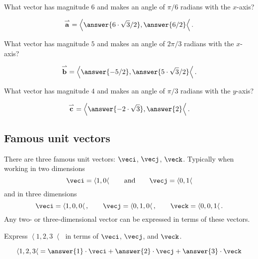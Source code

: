 \documentclass{ximera}
\begin{document}
\begin{question}
  What vector has magnitude $6$ and makes an angle of $\pi/6$ radians with the $x$-axis?
  \begin{prompt}
    \[
    \overset{\rightharpoonup}{\mathbf{a}} = \left\langle \answer{6\cdot \sqrt{3}/2},\answer{6/2} \right\langle.
    \]
  \end{prompt}
  \begin{question}
  What vector has magnitude $5$ and makes an angle of $2\pi/3$ radians with the $x$-axis?
  \begin{prompt}
    \[
    \overset{\rightharpoonup}{\mathbf{b}} = \left\langle \answer{-5/2},\answer{5\cdot \sqrt{3}/2} \right\langle.
    \]
  \end{prompt}
  \begin{question}
  What vector has magnitude $4$ and makes an angle of $\pi/3$ radians with the $y$-axis?
  \begin{prompt}
    \[
    \overset{\rightharpoonup}{\mathbf{c}} = \left\langle \answer{-2\cdot \sqrt{3}},\answer{2} \right\langle.
    \]
  \end{prompt}
  \end{question}
\end{question}
\end{question}

\subsection{Famous unit vectors}

There are three famous unit vectors: $\veci$, $\vecj$,
$\veck$. Typically when working in two dimensions
\[
\veci=\left\langle 1,0 \right\langle \qquad\text{and}\qquad\vecj=\left\langle 0,1 \right\langle
\]
and in three dimensions
\[
\veci=\left\langle 1,0,0 \right\langle,\qquad \vecj=\left\langle 0,1,0 \right\langle, \qquad\veck=\left\langle 0,0,1 \right\langle.
\]
Any two- or three-dimensional vector can be expressed in terms of these
vectors.

\begin{question}
  Express $\left\langle 1,2,3 \right\langle$ in terms of $\veci$, $\vecj$, and $\veck$.
  \begin{prompt}
    \[
    \left\langle 1,2,3 \right\langle = \answer{1}\cdot \veci + \answer{2}\cdot\vecj + \answer{3}\cdot\veck
    \]
  \end{prompt}
\end{question}
\end{document}

